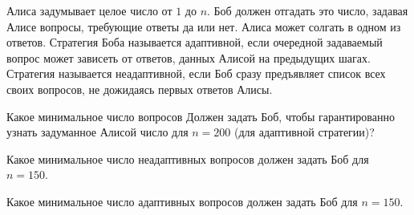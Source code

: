 Алиса задумывает целое число от $1$ до $n$. Боб должен отгадать это число, задавая Алисе вопросы, требующие ответы да или
нет. Алиса может солгать в одном из ответов. Стратегия Боба называется адаптивной, если очередной задаваемый вопрос может
зависеть от ответов, данных Алисой на предыдущих шагах. Стратегия называется неадаптивной, если Боб сразу предъявляет список
всех своих вопросов, не дожидаясь первых ответов Алисы.
\begin{enumcyr}
    \item Какое минимальное число вопросов Должен задать Боб, чтобы гарантированно узнать задуманное
        Алисой число для $n = 200$ (для адаптивной стратегии)?
    \item Какое минимальное число неадаптивных вопросов должен задать Боб для $n = 150$.
    \item Какое минимальное число адаптивных вопросов должен задать Боб для $n = 150$.
\end{enumcyr}
